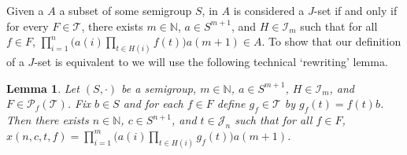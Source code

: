 \documentclass[12pt,showtrims]{memoir}
\theoremstyle{plain}
\newtheorem{lem}[thm]{Lemma}
\theoremstyle{definition}
\newcommand{\bbN}{\mathbb{N}}
\newcommand{\calI}{\mathcal{I}}
\newcommand{\calJ}{\mathcal{J}}
\newcommand{\calT}{\mathcal{T}}
\newcommand{\Pf}{\mathcal{P}_f}
\begin{document}
Given a $A$ a subset of some semigroup $S$, in \cite[Definition 2.2(a)]{Hindman:2009vn} $A$ is considered a $J$-set if and only if for every $F \in \calT$, there exists $m \in \bbN$, $a \in S^{m+1}$, and $H \in \calI_m$ such that for all $f \in F$, $\prod_{i=1}^n\bigl( a(i) \prod_{t \in H(i)} f(t) \bigr) a(m+1) \in A$.
To show that our definition of a $J$-set is equivalent to \cite[Definition 2.2(a)]{Hindman:2009vn} we will use the following technical `rewriting' lemma.

\begin{lem}
  \label{lem:rewrite-jset}
  Let $(S, \cdot)$ be a semigroup, $m \in \bbN$, $a \in S^{m+1}$, $H \in \calI_m$, and $F \in \Pf(\calT)$. 
  Fix $b \in S$ and for each $f \in F$ define $g_f \in \calT$ by $g_f(t) = f(t)b$. 
  Then there exists $n \in \bbN$, $c \in S^{n+1}$, and $t \in \calJ_n$ such that for all $f \in F$, $x(n, c, t, f) = \prod_{i=1}^m \bigl( a(i) \prod_{t \in H(i)} g_f(t)\big) a(m+1)$.
\end{lem}
\end{document}
